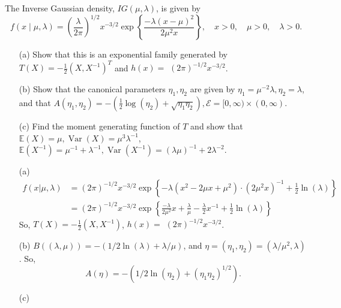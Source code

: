 \documentclass[12pt]{article}
\begin{document}
    \begin{exercise}
        The Inverse Gaussian density, \(I G(\mu, \lambda)\), is given by
        \[
            f(x \mid \mu, \lambda)=\left(\frac{\lambda}{2 \pi}\right)^{1 / 2} x^{-3 / 2} \exp \left\{\frac{-\lambda(x-\mu)^{2}}{2 \mu^{2} x}\right\}, \quad x>0, \quad \mu>0, \quad \lambda>0. 
        \]
        \begin{itemize}
            \item[(a)] Show that this is an exponential family generated by \(T(X)=-\frac{1}{2}\left(X, X^{-1}\right)^{T}\) and \(h(x)=\) \((2 \pi)^{-1 / 2} x^{-3 / 2}\). 
            \item[(b)] Show that the canonical parameters \(\eta_{1}, \eta_{2}\) are given by \(\eta_{1}=\mu^{-2} \lambda, \eta_{2}=\lambda\), and that \(A\left(\eta_{1}, \eta_{2}\right)=-\left(\frac{1}{2} \log \left(\eta_{2}\right)+\sqrt{\eta_{1} \eta_{2}}\right), \mathcal{E}=[0, \infty) \times(0, \infty)\). 
            \item[(c)] Find the moment generating function of \(T\) and show that \(\mathbb{E}(X)=\mu, \operatorname{Var}(X)=\mu^{3} \lambda^{-1}\), \(\mathbb{E}\left(X^{-1}\right)=\mu^{-1}+\lambda^{-1}, \operatorname{Var}\left(X^{-1}\right)=(\lambda \mu)^{-1}+2 \lambda^{-2} .\)
        \end{itemize}
    \end{exercise}

    \begin{solution}
        \begin{itemize}
            \item[(a)] \[
                \begin{aligned}
                    f(x|\mu,\lambda)&=(2 \pi)^{-1 / 2} x^{-3 / 2}\exp\left\{-\lambda(x^2-2\mu x+\mu^2)\cdot(2\mu^2x)^{-1}+\frac{1}{2}\ln(\lambda)\right\}\\
                    &=(2 \pi)^{-1 / 2} x^{-3 / 2}\exp\left\{\frac{-\lambda}{2\mu^2}x + \frac{\lambda}{\mu}-\frac{\lambda}{2}x^{-1}+\frac{1}{2}\ln(\lambda)\right\}
                \end{aligned}
            \]
            So, $T(X)=-\frac{1}{2}(X,X^{-1})$, \(h(x)=\) \((2 \pi)^{-1 / 2} x^{-3 / 2}\). 
            \item[(b)] $B((\lambda, \mu))=-(1/2\ln(\lambda)+\lambda/\mu)$, and $\eta=(\eta_1,\eta_2)=(\lambda/\mu^2, \lambda)$. So, 
            \[
                A(\eta)=-(1/2\ln(\eta_2)+(\eta_1\eta_2)^{1/2}). 
            \]
            \item[(c)] 
        \end{itemize}
    \end{solution}
\end{document}
